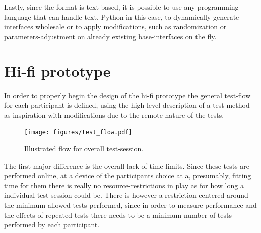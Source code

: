 {  Lastly, since the format is text-based, it is possible to use any programming
  language that can handle text, Python in this case, to dynamically generate
  interfaces wholesale or to apply modifications, such as randomization or
  parameters-adjustment on already existing base-interfaces on the fly.


\section{Hi-fi prototype}




  In order to properly begin the design of the hi-fi prototype the general
  test-flow for each participant is defined, using the high-level
  description of a test method\cite[p.78]{citeHandbookUsability} as
  inspiration with modifications due to the remote nature of the tests.



  \begin{figure}[h!]
    \centering
    \texttt{[image: figures/test\_flow.pdf]}
    \caption{Illustrated flow for overall test-session.}
  \end{figure}

  The first major difference is the overall lack of time-limits. Since these
  tests are performed online, at a device of the participants choice at a,
  presumably, fitting time for them there is really no resource-restrictions in
  play as for how long a individual test-session could be. There is however a
  restriction centered around the minimum allowed tests performed, since in
  order to measure performance and the effects of repeated tests there needs to
  be a minimum number of tests performed by each participant.

}
